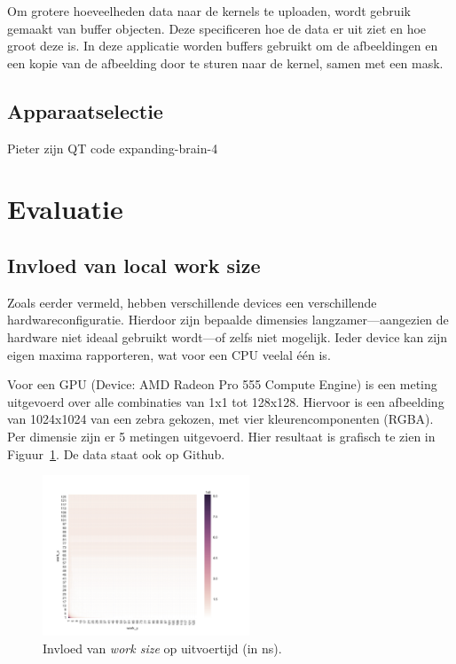 \documentclass[twocolumn, a4paper]{article}
\begin{document}
Om grotere hoeveelheden data naar de kernels te uploaden, wordt gebruik gemaakt van buffer objecten. Deze specificeren hoe de data er uit ziet en hoe groot deze is. In deze applicatie worden buffers gebruikt om de afbeeldingen en een kopie van de afbeelding door te sturen naar de kernel, samen met een mask.

\subsection{Apparaatselectie}
Pieter zijn QT code expanding-brain-4

\section{Evaluatie}

\subsection{Invloed van local work size}
Zoals eerder vermeld, hebben verschillende devices een verschillende hardwareconfiguratie. Hierdoor zijn bepaalde dimensies langzamer---aangezien de hardware niet ideaal gebruikt wordt---of zelfs niet mogelijk. Ieder device kan zijn eigen maxima rapporteren, wat voor een CPU veelal één is.

Voor een GPU (Device: AMD Radeon Pro 555 Compute Engine) is een meting uitgevoerd over alle combinaties van 1x1 tot 128x128. Hiervoor is een afbeelding van 1024x1024 van een zebra gekozen, met vier kleurencomponenten (RGBA). Per dimensie zijn er 5 metingen uitgevoerd. Hier resultaat is grafisch te zien in Figuur~\ref{fig:output-all}. De data staat ook op Github.

\begin{figure}
    \centering
    \includegraphics[width=0.55\textwidth]{data/output_powers.pdf}
    \caption{Invloed van \emph{work size} op uitvoertijd (in ns).}\label{fig:output-all}
\end{figure}
\end{document}
